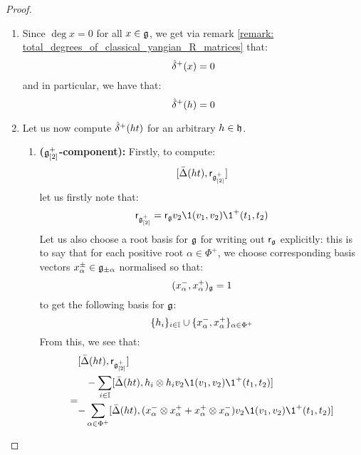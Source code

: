             \begin{proof}
                \begin{enumerate}
                    \item Since $\deg x = 0$ for all $x \in \mathfrak{g}$, we get via remark \ref{remark: total_degrees_of_classical_yangian_R_matrices} that:
                        $$\hat{\delta}^{+}(x) = 0$$
                    and in particular, we have that:
                        $$\hat{\delta}^{+}(h) = 0$$

                    \item Let us now compute $\hat{\delta}^{+}(ht)$ for an arbitrary $h \in \mathfrak{h}$. 
                    \begin{enumerate}
                        \item \textbf{($\mathfrak{g}_{[2]}^{+}$-component):} Firstly, to compute:
                            $$[\bar{\Delta}(ht), \mathsf{r}_{\mathfrak{g}_{[2]}^{+}}]$$
                        let us firstly note that:
                            $$\sfr_{\g_{[2]}^{\positive}} = \sfr_{\g} v_2\1(v_1, v_2) \1^+(t_1, t_2)$$
                        Let us also choose a root basis for $\mathfrak{g}$ for writing out $\mathsf{r}_{\mathfrak{g}}$ explicitly: this is to say that for each positive root $\alpha \in \Phi^+$, we choose corresponding basis vectors $x_{\alpha}^{\pm} \in \mathfrak{g}_{\pm \alpha}$ normalised so that:
                            $$(x_{\alpha}^-, x_{\alpha}^+)_{\mathfrak{g}} = 1$$
                        to get the following basis for $\mathfrak{g}$:
                            $$\{h_i\}_{i \in \mathbb{I}} \cup \{x_{\alpha}^-, x_{\alpha}^+\}_{\alpha \in \Phi^+}$$
                        From this, we see that:
                            $$
                                \begin{aligned}
                                    & [\bar{\Delta}(ht), \sfr_{\g_{[2]}^{\positive}}]
                                    \\
                                    = & 
                                    \begin{aligned}
                                        & -\sum_{i \in \simpleroots} [\bar{\Delta}(ht), h_i \tensor h_i v_2\1(v_1, v_2) \1^+(t_1, t_2)]
                                        \\
                                        - & \sum_{\alpha \in \Phi^+} [\bar{\Delta}(ht), (x_{\alpha}^- \tensor x_{\alpha}^+ + x_{\alpha}^+ \tensor x_{\alpha}^-) v_2\1(v_1, v_2) \1^+(t_1, t_2)]
                                    \end{aligned}
                                \end{aligned}
                            $$


\end{enumerate}
\end{enumerate}
\end{proof}
